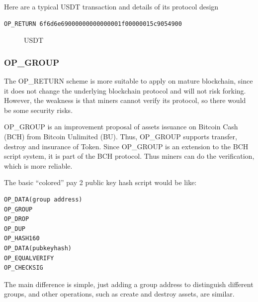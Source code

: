 \documentclass[a4paper,11pt]{article}
\begin{document}
Here are a typical USDT transaction and details of its protocol design


\lstset{basicstyle=\tiny,style=myListStyle}
\begin{lstlisting}
OP_RETURN 6f6d6e69000000000000001f00000015c9054900
\end{lstlisting}


\begin{figure}[hbt]
	\centerline{%
	}
\caption{USDT}
\end{figure}





\subsubsection*{OP\_GROUP}
The OP\_RETURN  scheme is more suitable to apply on mature blockchain, since it does not change the underlying blockchain protocol and will not risk forking. However, the weakness is that miners cannot verify its protocol, so there would be some security risks.

OP\_GROUP\cite{OP_GROUP}  is an improvement proposal of assets issuance on Bitcoin Cash (BCH)\cite{BCH} from Bitcoin Unlimited (BU). Thus, OP\_GROUP  supports transfer, destroy and insurance of Token. Since OP\_GROUP is an extension to the BCH script system,  it is part of the BCH protocol. Thus miners can do the verification, which is more reliable.

The basic “colored” pay 2 public key hash script would be like:

\lstset{basicstyle=\tiny,style=myListStyle}
\begin{lstlisting}[numbers=none]
OP_DATA(group address)
OP_GROUP
OP_DROP
OP_DUP
OP_HASH160
OP_DATA(pubkeyhash)
OP_EQUALVERIFY
OP_CHECKSIG
\end{lstlisting}

The main difference is simple, just adding a group address to distinguish different groups, and other operations, such as create and destroy assets, are similar.
\end{document}

